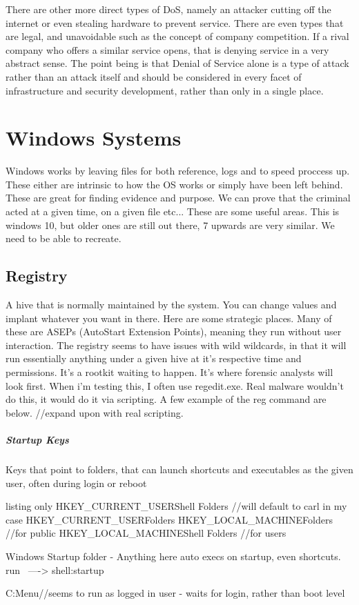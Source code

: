 There are other more direct types of DoS, namely an attacker cutting off the internet or even stealing hardware to prevent service. There are even types that are legal, and unavoidable such as the concept of company competition. If a rival company who offers a similar service opens, that is denying service in a very abstract sense.
The point being is that Denial of Service alone is a type of attack rather than an attack itself and should be considered in every facet of infrastructure and security development, rather than only in a single place.
\citep{AssignmentDOSPaper}

\section{Windows Systems}
Windows works by leaving files for both reference, logs and to speed proccess up. These either are intrinsic to how the OS works or simply have been left behind. 
These are great for finding evidence and purpose. We can prove that the criminal acted at a given time, on a given file etc... These are some useful areas. This is windows 10, but older ones are still out there, 7 upwards are very similar. We need to be able to recreate.

\subsection{Registry}
A hive that is normally maintained by the system. You can change values and implant whatever you want in there. Here are some strategic places. 
Many of these are ASEPs (AutoStart Extension Points), meaning they run without user interaction. The registry seems to have issues with wild wildcards, 
in that it will run essentially anything under a given hive at it's respective time and permissions. It's a rootkit waiting to happen. 
It's where forensic analysts will look first. When i'm testing this, I often use regedit.exe. Real malware wouldn't do this, it would do it via scripting. 
A few example of the reg command are below. 
//expand upon with real scripting.


\subparagraph{Startup Keys}
Keys that point to folders, that can launch shortcuts and executables as the given user, often during login or reboot
\begin{tcblisting}{listing only}
HKEY_CURRENT_USER\Software\Microsoft\Windows\CurrentVersion\Explorer\User Shell Folders //will default to carl in my case
HKEY_CURRENT_USER\Software\Microsoft\Windows\CurrentVersion\Explorer\Shell Folders
HKEY_LOCAL_MACHINE\SOFTWARE\Microsoft\Windows\CurrentVersion\Explorer\Shell Folders //for public
HKEY_LOCAL_MACHINE\SOFTWARE\Microsoft\Windows\CurrentVersion\Explorer\User Shell Folders  //for users

Windows Startup folder - Anything here auto execs on startup, even shortcuts. run  ----> shell:startup

C:\Users\USERNAME\AppData\Roaming\Microsoft\Windows\Start Menu\Programs\Startup //seems to run as logged in user - waits for login, rather than boot level

\end{tcblisting}



